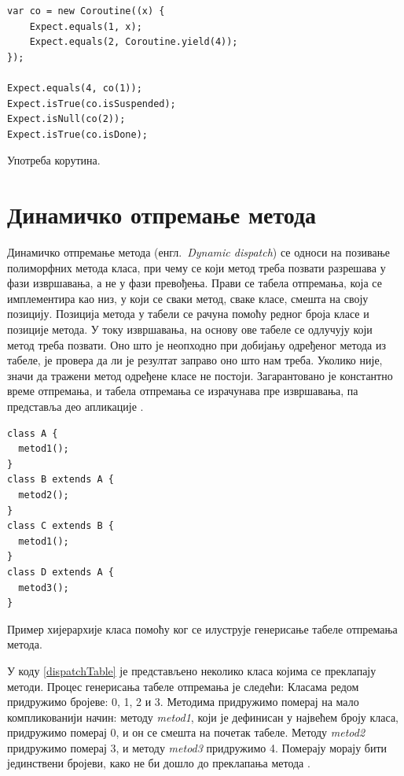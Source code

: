 \documentclass[12pt,oneside]{memoir}
\begin{document}
\begin{listing}
\begin{verbatim}
var co = new Coroutine((x) {
    Expect.equals(1, x);
    Expect.equals(2, Coroutine.yield(4));
});

Expect.equals(4, co(1));
Expect.isTrue(co.isSuspended);
Expect.isNull(co(2));
Expect.isTrue(co.isDone);
\end{verbatim}
\caption{Употреба корутина.}
\label{coroutines}
\end{listing}

\section{Динамичко отпремање метода}
\label{sec:otpremanje}

Динамичко отпремање метода (енгл.~\textit{Dynamic dispatch}) се односи на позивање полиморфних метода класа, при чему се који метод треба позвати разрешава у фази извршавања, а не у фази превођења. Прави се табела отпремања, која се имплементира као низ, у који се сваки метод, сваке класе, смешта на своју позицију. Позиција метода у табели се рачуна помоћу редног броја класе и позиције метода. У току извршавања, на основу ове табеле се одлучују који метод треба позвати. Оно што је неопходно при добијању одређеног метода из табеле, је провера да ли је резултат заправо оно што нам треба. Уколико није, значи да тражени метод одређене класе не постоји. Загарантовано је константно време отпремања, и табела отпремања се израчунава пре извршавања, па представља део апликације \cite{Dartino}.

\begin{listing}
\begin{verbatim}
class A {
  metod1();
}
class B extends A {
  metod2();
}
class C extends B {
  metod1();
}
class D extends A {
  metod3();
}
\end{verbatim}
\caption{Пример хијерархије класа помоћу ког се илуструје генерисање табеле отпремања метода.}
\label{dispatchTable}
\end{listing}

У коду \ref{dispatchTable} је представљено неколико класа којима се преклапају методи. Процес генерисања табеле отпремања је следећи: Класама редом придружимо бројеве: 0, 1, 2 и 3. Методима придружимо померај на мало компликованији начин: методу \textit{metod1}, који је дефинисан у највећем броју класа, придружимо померај 0, и он се смешта на почетак табеле. Методу \textit{metod2} придружимо померај 3, и методу \textit{metod3} придружимо 4. Померају морају бити јединствени бројеви, како не би дошло до преклапања метода \cite{Dartino}.
\end{document}
